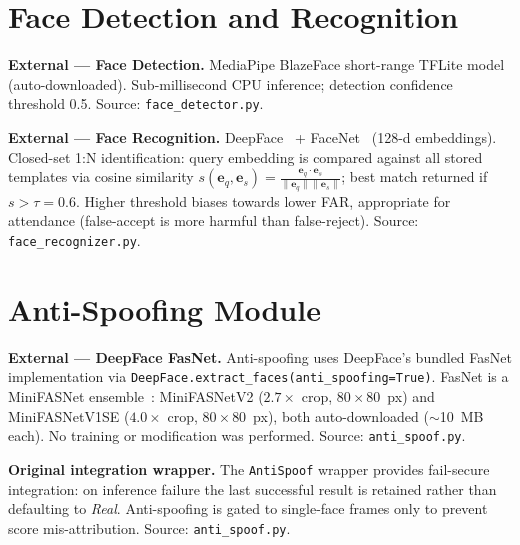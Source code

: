 \documentclass[10pt,a4paper]{article}
\begin{document}
\section{Face Detection and Recognition}
\label{sec:detrecog}

\begin{externalbox}
\textbf{External --- Face Detection.}
MediaPipe BlazeFace short-range TFLite model~\cite{bazarevsky2019blazeface} (auto-downloaded).
Sub-millisecond CPU inference; detection confidence threshold 0.5.
Source: \texttt{face\_detector.py}.
\end{externalbox}

\smallskip

\begin{externalbox}
\textbf{External --- Face Recognition.}
DeepFace~\cite{serengil2021lightface} + FaceNet~\cite{schroff2015facenet} (128-d embeddings).
Closed-set 1:N identification: query embedding is compared against all stored templates
via cosine similarity $s(\mathbf{e}_q,\mathbf{e}_s) = \tfrac{\mathbf{e}_q\cdot\mathbf{e}_s}{\|\mathbf{e}_q\|\|\mathbf{e}_s\|}$;
best match returned if $s > \tau\!=\!0.6$.
Higher threshold biases towards lower FAR, appropriate for attendance (false-accept is
more harmful than false-reject).
Source: \texttt{face\_recognizer.py}.
\end{externalbox}

\section{Anti-Spoofing Module}
\label{sec:antispoof}

\begin{externalbox}
\textbf{External --- DeepFace FasNet.}
Anti-spoofing uses DeepFace's bundled FasNet implementation via
\texttt{DeepFace.extract\_faces(anti\_spoofing=True)}.
FasNet is a MiniFASNet ensemble~\cite{liu2021minifasnet}:
MiniFASNetV2 ($2.7\times$ crop, $80\times 80$~px) and MiniFASNetV1SE
($4.0\times$ crop, $80\times 80$~px), both auto-downloaded ($\sim$10~MB each).
No training or modification was performed.
Source: \texttt{anti\_spoof.py}.
\end{externalbox}

\begin{originalbox}
\textbf{Original integration wrapper.}
The \texttt{AntiSpoof} wrapper provides fail-secure integration: on inference failure
the last successful result is retained rather than defaulting to \textit{Real}.
Anti-spoofing is gated to single-face frames only to prevent score mis-attribution.
Source: \texttt{anti\_spoof.py}.
\end{originalbox}
\end{document}
